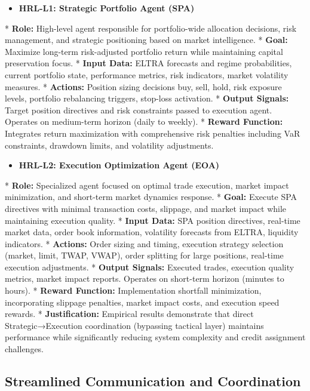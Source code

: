 \documentclass[11pt,a4paper]{article}
\begin{document}
\begin{itemize}
\item   \textbf{HRL-L1: Strategic Portfolio Agent (SPA)}
\end{itemize}
    *   \textbf{Role:} High-level agent responsible for portfolio-wide allocation decisions, risk management, and strategic positioning based on market intelligence.
    *   \textbf{Goal:} Maximize long-term risk-adjusted portfolio return while maintaining capital preservation focus.
    *   \textbf{Input Data:} ELTRA forecasts and regime probabilities, current portfolio state, performance metrics, risk indicators, market volatility measures.
    *   \textbf{Actions:} Position sizing decisions {buy, sell, hold}, risk exposure levels, portfolio rebalancing triggers, stop-loss activation.
    *   \textbf{Output Signals:} Target position directives and risk constraints passed to execution agent. Operates on medium-term horizon (daily to weekly).
    *   \textbf{Reward Function:} Integrates return maximization with comprehensive risk penalties including VaR constraints, drawdown limits, and volatility adjustments.
\begin{itemize}
\item   \textbf{HRL-L2: Execution Optimization Agent (EOA)}
\end{itemize}
    *   \textbf{Role:} Specialized agent focused on optimal trade execution, market impact minimization, and short-term market dynamics response.
    *   \textbf{Goal:} Execute SPA directives with minimal transaction costs, slippage, and market impact while maintaining execution quality.
    *   \textbf{Input Data:} SPA position directives, real-time market data, order book information, volatility forecasts from ELTRA, liquidity indicators.
    *   \textbf{Actions:} Order sizing and timing, execution strategy selection (market, limit, TWAP, VWAP), order splitting for large positions, real-time execution adjustments.
    *   \textbf{Output Signals:} Executed trades, execution quality metrics, market impact reports. Operates on short-term horizon (minutes to hours).
    *   \textbf{Reward Function:} Implementation shortfall minimization, incorporating slippage penalties, market impact costs, and execution speed rewards.
    *   \textbf{Justification:} Empirical results demonstrate that direct Strategic→Execution coordination (bypassing tactical layer) maintains performance while significantly reducing system complexity and credit assignment challenges.

\subsection{Streamlined Communication and Coordination}
\end{document}
